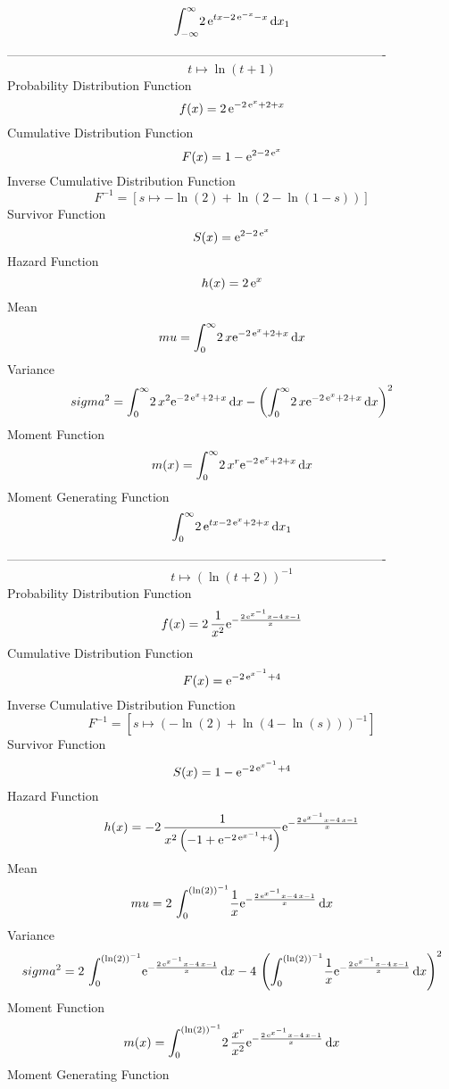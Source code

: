 \documentclass[12pt]{article}
\begin{document}
 $$\int_{-\infty }^{\infty }\!2\,{{\rm e}^{tx-2\,{{\rm e}^{-x}}-x}}
\,{\rm d}x_{{1}}
$$-------------------------------------------------------------------------------------------  \\$$t\mapsto \ln  \left( t+1 \right) 
$$Probability Distribution Function 
$$  f(x)=2\,{{\rm e}^{-2\,{{\rm e}^{x}}+2+x}}
$$Cumulative Distribution Function  
 $$F(x)=1-{{\rm e}^{2-2\,{{\rm e}^{x}}}}
$$ Inverse Cumulative Distribution Function 
  $$F^{-1} = [s\mapsto -\ln  \left( 2 \right) +\ln  \left( 2-\ln  \left( 1-s
 \right)  \right) ]
$$Survivor Function 
 $$ S(x)={{\rm e}^{2-2\,{{\rm e}^{x}}}}
$$ Hazard Function 
 $$ h(x)=2\,{{\rm e}^{x}}
$$Mean 
 $$ mu=\int_{0}^{\infty }\!2\,x{{\rm e}^{-2\,{{\rm e}^{x}}+2+x}}\,{\rm d}x
$$ Variance 
 $$ sigma^2 = \int_{0}^{\infty }\!2\,{x}^{2}{{\rm e}^{-2\,{{\rm e}^{x}}+2+x}}
\,{\rm d}x- \left( \int_{0}^{\infty }\!2\,x{{\rm e}^{-2\,{{\rm e}^{x}}
+2+x}}\,{\rm d}x \right) ^{2}
$$Moment Function 
 $$ m(x) = \int_{0}^{\infty }\!2\,{x}^{r}{{\rm e}^{-2\,{{\rm e}^{x}}+2+x}}
\,{\rm d}x
$$ Moment Generating Function 
 $$\int_{0}^{\infty }\!2\,{{\rm e}^{tx-2\,{{\rm e}^{x}}+2+x}}\,{\rm d}x_{
{1}}
$$-------------------------------------------------------------------------------------------  \\$$t\mapsto  \left( \ln  \left( t+2 \right)  \right) ^{-1}
$$Probability Distribution Function 
$$  f(x)=2\,{\frac {1}{{x}^{2}}{{\rm e}^{-{\frac {2\,{{\rm e}^{{x}^{-1}}}x-4\,x
-1}{x}}}}}
$$Cumulative Distribution Function  
 $$F(x)={{\rm e}^{-2\,{{\rm e}^{{x}^{-1}}}+4}}
$$ Inverse Cumulative Distribution Function 
  $$F^{-1} = [s\mapsto  \left( -\ln  \left( 2 \right) +\ln  \left( 4-\ln  \left( s
 \right)  \right)  \right) ^{-1}]
$$Survivor Function 
 $$ S(x)=1-{{\rm e}^{-2\,{{\rm e}^{{x}^{-1}}}+4}}
$$ Hazard Function 
 $$ h(x)=-2\,{\frac {1}{{x}^{2} \left( -1+{{\rm e}^{-2\,{{\rm e}^{{x}^{-1}}}+4}
} \right) }{{\rm e}^{-{\frac {2\,{{\rm e}^{{x}^{-1}}}x-4\,x-1}{x}}}}}
$$Mean 
 $$ mu=2\,\int_{0}^{ \left( \ln  \left( 2 \right)  \right) ^{-1}}\!{\frac {1
}{x}{{\rm e}^{-{\frac {2\,{{\rm e}^{{x}^{-1}}}x-4\,x-1}{x}}}}}
\,{\rm d}x
$$ Variance 
 $$ sigma^2 = 2\,\int_{0}^{ \left( \ln  \left( 2 \right)  \right) ^{-1}}\!{{\rm e}^{
-{\frac {2\,{{\rm e}^{{x}^{-1}}}x-4\,x-1}{x}}}}\,{\rm d}x-4\, \left( 
\int_{0}^{ \left( \ln  \left( 2 \right)  \right) ^{-1}}\!{\frac {1}{x}
{{\rm e}^{-{\frac {2\,{{\rm e}^{{x}^{-1}}}x-4\,x-1}{x}}}}}\,{\rm d}x
 \right) ^{2}
$$Moment Function 
 $$ m(x) = \int_{0}^{ \left( \ln  \left( 2 \right)  \right) ^{-1}}\!2\,{\frac {{x
}^{r}}{{x}^{2}}{{\rm e}^{-{\frac {2\,{{\rm e}^{{x}^{-1}}}x-4\,x-1}{x}}
}}}\,{\rm d}x
$$ Moment Generating Function 
\end{document}

